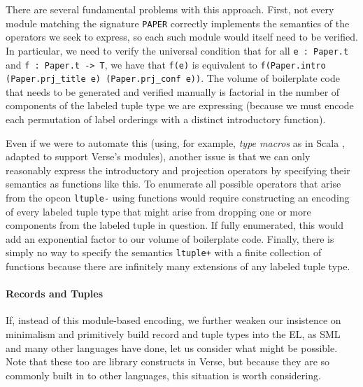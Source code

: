 There are several fundamental problems with this approach. First, not every module matching the signature \lstinline{PAPER} correctly implements the semantics of the operators we seek to express, so each such module would itself need to be verified. In particular, we need to verify the universal condition that for all \lstinline{e : Paper.t} and \lstinline{f : Paper.t -> T}, we have that \lstinline{f(e)} is equivalent to \lstinline{f(Paper.intro (Paper.prj_title e) (Paper.prj_conf e))}. The volume of boilerplate code that needs to be generated and verified manually is factorial in the number of components of the labeled tuple type we are expressing (because we must encode each permutation of label orderings with a distinct introductory function).%

Even if we were to automate this (using, for example, \emph{type macros} as  in Scala \cite{ScalaMacros2013}, adapted to support Verse's modules), another issue is that we can only reasonably express the introductory and projection operators by specifying their semantics as functions like this. To enumerate all possible operators that arise from the opcon \lstinline{ltuple-} using functions would require constructing an encoding of every labeled tuple type that might arise from dropping one or more components from the labeled tuple in question. If fully enumerated, this would add an  exponential factor to our volume of boilerplate code. 
Finally, there is simply no way to specify the semantics \lstinline{ltuple+} with a finite collection of functions because there are infinitely many extensions of any labeled tuple type. %


\paragraph{Records and Tuples}
If, instead of this module-based encoding, we further weaken our insistence on minimalism and primitively build record and tuple types into the EL, as SML and many other languages have done, let us consider what might be possible. Note that these too are library constructs in Verse, but because they are so commonly built in to other languages, this situation is worth considering.%

